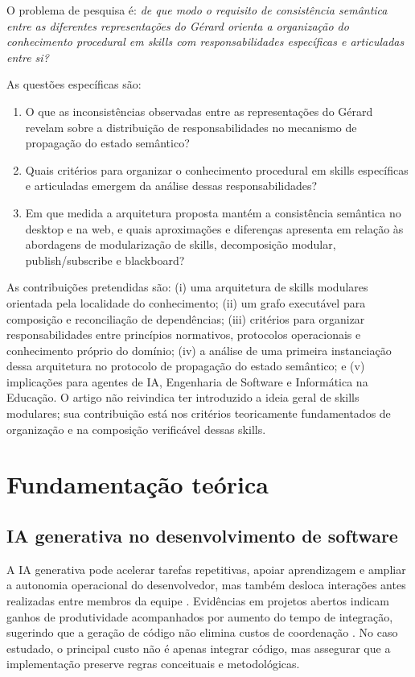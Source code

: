 \documentclass[preprint,12pt,authoryear]{elsarticle}
\newcommand{\gerard}{Gérard\xspace}
\begin{document}
O problema de pesquisa é: \emph{de que modo o requisito de consistência semântica entre as diferentes representações do \gerard orienta a organização do conhecimento procedural em skills com responsabilidades específicas e articuladas entre si?}

As questões específicas são:
\begin{enumerate}[label=QP\arabic*.]
  \item O que as inconsistências observadas entre as representações do \gerard revelam sobre a distribuição de responsabilidades no mecanismo de propagação do estado semântico?
  \item Quais critérios para organizar o conhecimento procedural em skills específicas e articuladas emergem da análise dessas responsabilidades?
  \item Em que medida a arquitetura proposta mantém a consistência semântica no desktop e na web, e quais aproximações e diferenças apresenta em relação às abordagens de modularização de skills, decomposição modular, publish/subscribe e blackboard?
\end{enumerate}

As contribuições pretendidas são: (i) uma arquitetura de skills modulares orientada pela localidade do conhecimento; (ii) um grafo executável para composição e reconciliação de dependências; (iii) critérios para organizar responsabilidades entre princípios normativos, protocolos operacionais e conhecimento próprio do domínio; (iv) a análise de uma primeira instanciação dessa arquitetura no protocolo de propagação do estado semântico; e (v) implicações para agentes de IA, Engenharia de Software e Informática na Educação. O artigo não reivindica ter introduzido a ideia geral de skills modulares; sua contribuição está nos critérios teoricamente fundamentados de organização e na composição verificável dessas skills.

\section{Fundamentação teórica}
\subsection{IA generativa no desenvolvimento de software}
A IA generativa pode acelerar tarefas repetitivas, apoiar aprendizagem e ampliar a autonomia operacional do desenvolvedor, mas também desloca interações antes realizadas entre membros da equipe \citep{ulfsnes2024transforming}. Evidências em projetos abertos indicam ganhos de produtividade acompanhados por aumento do tempo de integração, sugerindo que a geração de código não elimina custos de coordenação \citep{song2024impact}. No caso estudado, o principal custo não é apenas integrar código, mas assegurar que a implementação preserve regras conceituais e metodológicas.
\end{document}
